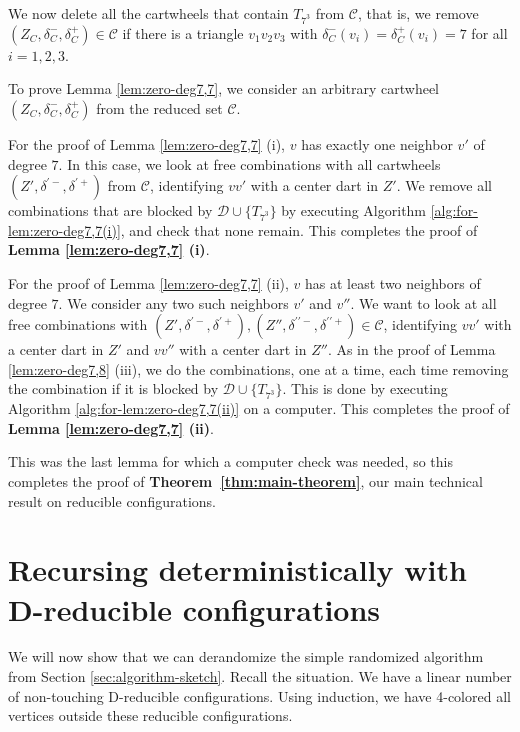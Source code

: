 \documentclass[10pt,a4paper]{article}
\def\Tseven{{T_{7^3}}}
\begin{document}
We now delete all the cartwheels that contain $\Tseven$ from $\mathcal{C}$, that is, 
 we remove $(Z_C, \delta_C^-, \delta_C^+) \in \mathcal{C}$ if there is a triangle $v_1v_2v_3$ with $\delta_C^-(v_i)=\delta_C^+(v_i)=7$ for all $i=1,2,3$.

To prove  
Lemma \ref{lem:zero-deg7,7}, we consider an arbitrary cartwheel
$(Z_C, \delta_C^-, \delta_C^+)$ from the reduced set $\mathcal{C}$.

For the proof of Lemma \ref{lem:zero-deg7,7} (i), $v$ has exactly one neighbor $v'$ of degree $7$.
In this case, we look at free combinations with all cartwheels $(Z', \delta^{\prime-}, \delta^{\prime+})$ from $\mathcal{C}$, identifying $vv'$ with a center dart in $Z'$. We remove all combinations that are blocked by $\mathcal{D} \cup \{\Tseven\}$ by executing Algorithm \ref{alg:for-lem:zero-deg7,7(i)}, and check that none remain.
This completes the proof of \textbf{Lemma \ref{lem:zero-deg7,7} (i)}. 

For the proof of Lemma \ref{lem:zero-deg7,7} (ii), $v$ has at least two neighbors of degree $7$.
We consider any two such neighbors $v'$ and $v''$.
We want to look at all free combinations with $(Z', \delta^{\prime-}, \delta^{\prime+}), (Z'', \delta^{\prime\prime-}, \delta^{\prime\prime+}) \in \mathcal{C}$, identifying $vv'$ with a center dart in $Z'$ and $vv''$ with a center dart in $Z''$. As in the proof of Lemma \ref{lem:zero-deg7,8} (iii), we do the combinations, one at a time, each time removing the combination if it is blocked by $\mathcal{D} \cup \{\Tseven\}$. This is done by executing Algorithm \ref{alg:for-lem:zero-deg7,7(ii)} on a computer.
This completes the proof of \textbf{Lemma \ref{lem:zero-deg7,7} (ii)}.

This was the last lemma for which a computer check was needed, so this completes the proof of {\bf Theorem~\ref{thm:main-theorem}}, our main technical result on reducible configurations.

\section{Recursing deterministically with D-reducible configurations}\label{sect:D-reducible}


We will now show that we can derandomize the simple randomized algorithm from Section \ref{sec:algorithm-sketch}. 
Recall the situation. We have a linear number of non-touching D-reducible configurations. Using induction, we have 4-colored
all vertices outside these reducible configurations.
\end{document}
